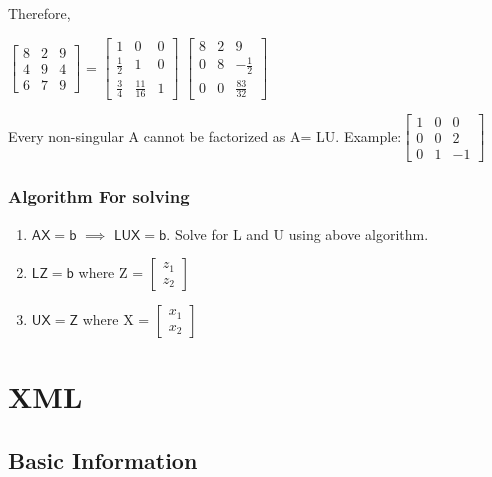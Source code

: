 \documentclass[a4paper,oneside]{book}
\begin{document}
Therefore,
\begin{center}
 $\begin{bmatrix}
8 & 2 & 9 \\
4 & 9 & 4 \\
6 & 7 & 9
\end{bmatrix}$ = $\begin{bmatrix}
1 & 0 & 0 \\
\frac{1}{2} & 1 & 0 \\[0.3em]
\frac{3}{4} & \frac{11}{16} & 1
\end{bmatrix}$ $\begin{bmatrix}
8 & 2 & 9 \\
0 & 8 & -\frac{1}{2} \\[0.3em]
0 & 0 & \frac{83}{32}
\end{bmatrix}$ 
\end{center}
\begin{mdframed}[style=MyFrame]
Every non-singular A cannot be factorized as A= LU.
Example:$\begin{bmatrix}
1 & 0 & 0 \\
0 & 0& 2 \\
0 & 1 & -1
\end{bmatrix}$
\end{mdframed}
\section{Algorithm For solving}
\begin{enumerate}
\item $\mathsf{AX = b}$ $\implies$ $\mathsf{LUX = b}$. Solve for L and U using above algorithm. 
\item $\mathsf{LZ = b}$ where Z = $\begin{bmatrix}
z_1 \\ z_2
\end{bmatrix}$ 
\item $\mathsf{UX = Z}$ where X = $\begin{bmatrix}
x_1 \\ x_2
\end{bmatrix}$ 
\end{enumerate}

\part{XML}
\chapter{Basic Information}
\end{document}
